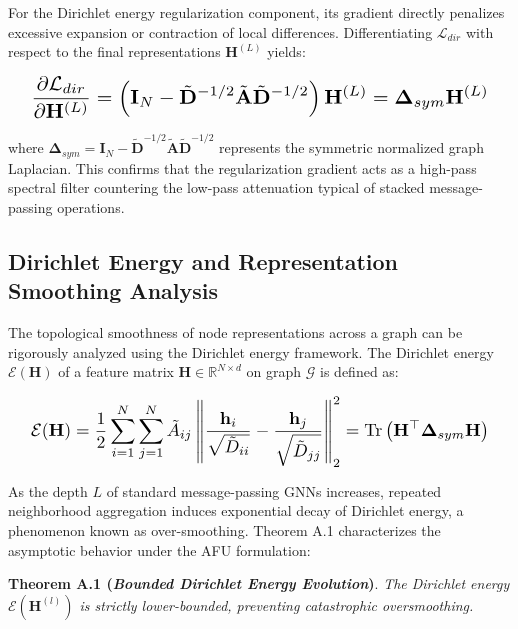 \documentclass[10pt,twocolumn]{article}
\begin{document}
For the Dirichlet energy regularization component, its gradient directly penalizes excessive expansion or contraction of local differences. Differentiating $\mathcal{L}_{dir}$ with respect to the final representations $\mathbf{H}^{(L)}$ yields:

\begin{equation}
\resizebox{0.95\columnwidth}{!}{\ensuremath{\displaystyle \frac{\partial \mathcal{L}_{dir}}{\partial \mathbf{H}^{(L)}} = \left( \mathbf{I}_N - \tilde{\mathbf{D}}^{-1/2} \tilde{\mathbf{A}} \tilde{\mathbf{D}}^{-1/2} \right) \mathbf{H}^{(L)} = \mathbf{\Delta}_{sym} \mathbf{H}^{(L)}}}
\end{equation}

\noindent where $\mathbf{\Delta}_{sym} = \mathbf{I}_N - \tilde{\mathbf{D}}^{-1/2} \tilde{\mathbf{A}} \tilde{\mathbf{D}}^{-1/2}$ represents the symmetric normalized graph Laplacian. This confirms that the regularization gradient acts as a high-pass spectral filter countering the low-pass attenuation typical of stacked message-passing operations.

\subsection{Dirichlet Energy and Representation Smoothing Analysis}

The topological smoothness of node representations across a graph can be rigorously analyzed using the Dirichlet energy framework. The Dirichlet energy $\mathcal{E}(\mathbf{H})$ of a feature matrix $\mathbf{H} \in \mathbb{R}^{N \times d}$ on graph $\mathcal{G}$ is defined as:

\begin{equation}
\resizebox{0.95\columnwidth}{!}{\ensuremath{\displaystyle \mathcal{E}(\mathbf{H}) = \frac{1}{2} \sum_{i=1}^{N} \sum_{j=1}^{N} \tilde{A}_{ij} \left\| \frac{\mathbf{h}_i}{\sqrt{\tilde{D}_{ii}}} - \frac{\mathbf{h}_j}{\sqrt{\tilde{D}_{jj}}} \right\|_2^2 = \text{Tr}\left( \mathbf{H}^\top \mathbf{\Delta}_{sym} \mathbf{H} \right)}}
\end{equation}

As the depth $L$ of standard message-passing GNNs increases, repeated neighborhood aggregation induces exponential decay of Dirichlet energy, a phenomenon known as over-smoothing. Theorem A.1 characterizes the asymptotic behavior under the \textsc{AFU} formulation:

\vspace{0.5em}
\noindent \textbf{Theorem A.1 (\textit{Bounded Dirichlet Energy Evolution})}. \textit{The Dirichlet energy $\mathcal{E}(\mathbf{H}^{(l)})$ is strictly lower-bounded, preventing catastrophic oversmoothing.}
\end{document}
